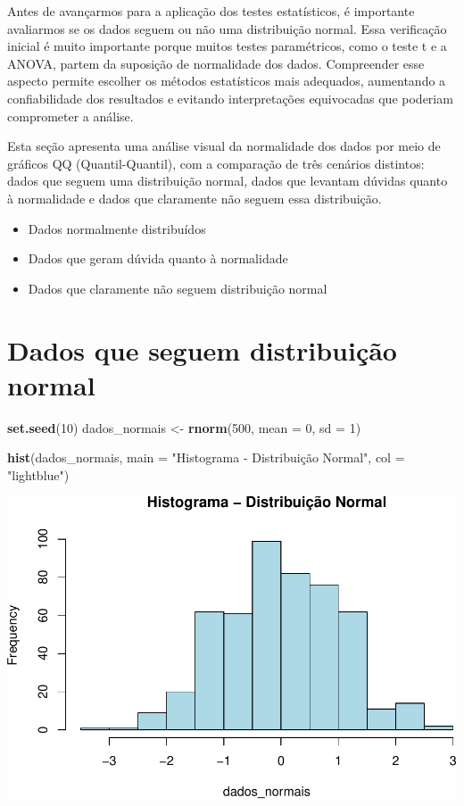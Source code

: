 \documentclass[
]{book}
\newenvironment{Shaded}{\begin{snugshade}}{\end{snugshade}}
\newcommand{\AttributeTok}[1]{\textcolor[rgb]{0.13,0.29,0.53}{#1}}
\newcommand{\DecValTok}[1]{\textcolor[rgb]{0.00,0.00,0.81}{#1}}
\newcommand{\FunctionTok}[1]{\textcolor[rgb]{0.13,0.29,0.53}{\textbf{#1}}}
\newcommand{\NormalTok}[1]{#1}
\newcommand{\OtherTok}[1]{\textcolor[rgb]{0.56,0.35,0.01}{#1}}
\newcommand{\StringTok}[1]{\textcolor[rgb]{0.31,0.60,0.02}{#1}}
\providecommand{\tightlist}{%
  \setlength{\itemsep}{0pt}\setlength{\parskip}{0pt}}
\begin{document}
Antes de avançarmos para a aplicação dos testes estatísticos, é importante avaliarmos se os dados seguem ou não uma distribuição normal. Essa verificação inicial é muito importante porque muitos testes paramétricos, como o teste t e a ANOVA, partem da suposição de normalidade dos dados. Compreender esse aspecto permite escolher os métodos estatísticos mais adequados, aumentando a confiabilidade dos resultados e evitando interpretações equivocadas que poderiam comprometer a análise.

Esta seção apresenta uma análise visual da normalidade dos dados por meio de gráficos QQ (Quantil-Quantil), com a comparação de três cenários distintos: dados que seguem uma distribuição normal, dados que levantam dúvidas quanto à normalidade e dados que claramente não seguem essa distribuição.

\begin{itemize}
\tightlist
\item
  Dados normalmente distribuídos
\item
  Dados que geram dúvida quanto à normalidade
\item
  Dados que claramente não seguem distribuição normal
\end{itemize}

\section{Dados que seguem distribuição normal}\label{dados-que-seguem-distribuiuxe7uxe3o-normal}

\begin{Shaded}
\begin{Highlighting}[]
\FunctionTok{set.seed}\NormalTok{(}\DecValTok{10}\NormalTok{)}
\NormalTok{dados\_normais }\OtherTok{\textless{}{-}} \FunctionTok{rnorm}\NormalTok{(}\DecValTok{500}\NormalTok{, }\AttributeTok{mean =} \DecValTok{0}\NormalTok{, }\AttributeTok{sd =} \DecValTok{1}\NormalTok{)}

\FunctionTok{hist}\NormalTok{(dados\_normais, }\AttributeTok{main =} \StringTok{"Histograma {-} Distribuição Normal"}\NormalTok{, }\AttributeTok{col =} \StringTok{"lightblue"}\NormalTok{)}
\end{Highlighting}
\end{Shaded}

\includegraphics{LivroEstatisticaR_files/figure-latex/enormalDist-1.pdf}
\end{document}
